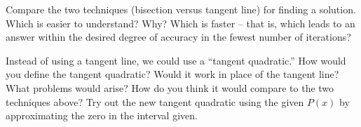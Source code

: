 \documentclass
[justified,nohyper]
{tufte-handout}
\theoremstyle{mydef}
\begin{document}
Compare the two techniques (bisection versus tangent line) for finding a solution. Which is easier to understand? Why? Which is faster -- that is, which leads to an answer within the desired degree of accuracy in the fewest number of iterations?

Instead of using a tangent line, we could use a ``tangent quadratic.'' How would you define the tangent quadratic? Would it work in place of the tangent line? What problems would arise? How do you think it would compare to the two techniques above? Try out the new tangent quadratic using the given $P(x)$ by approximating the zero in the interval given.
\end{document}
